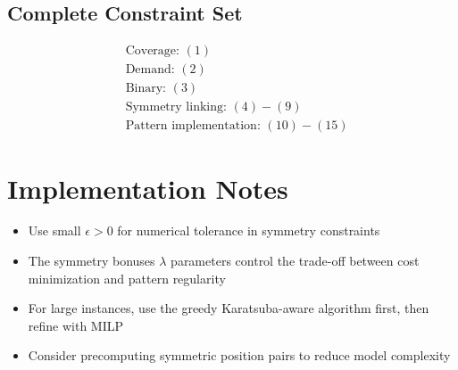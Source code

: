 \documentclass{article}
\begin{document}
\subsection{Complete Constraint Set}
\begin{align}
&\text{Coverage: } (1) \\
&\text{Demand: } (2) \\
&\text{Binary: } (3) \\
&\text{Symmetry linking: } (4)-(9) \\
&\text{Pattern implementation: } (10)-(15)
\end{align}

\section{Implementation Notes}

\begin{itemize}
\item Use small $\epsilon > 0$ for numerical tolerance in symmetry constraints
\item The symmetry bonuses $\lambda$ parameters control the trade-off between cost minimization and pattern regularity
\item For large instances, use the greedy Karatsuba-aware algorithm first, then refine with MILP
\item Consider precomputing symmetric position pairs to reduce model complexity
\end{itemize}
\end{document}
